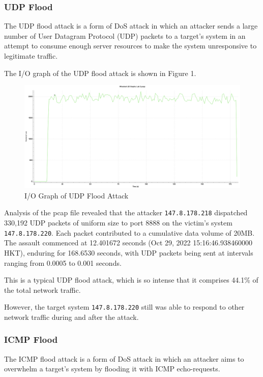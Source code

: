 \documentclass{article}
\begin{document}
    \subsubsection{UDP Flood}\label{subsubsec:udp-flood}
    The UDP flood attack is a form of DoS attack in which an attacker sends a large number of User Datagram Protocol (UDP) packets to a target's system in an attempt to consume enough server resources to make the system unresponsive to legitimate traffic.

    The I/O graph of the UDP flood attack is shown in Figure 1.

    \begin{figure}[H]
        \centering
        \includegraphics[width=\textwidth]{image/218_udp.png}
        \caption{I/O Graph of UDP Flood Attack}
        \label{fig:udp-flood-io-graph}
    \end{figure}

    Analysis of the pcap file revealed that the attacker \lstinline|147.8.178.218| dispatched 330,192 UDP packets of uniform size to port 8888 on the victim's system \lstinline|147.8.178.220|. 
    Each packet contributed to a cumulative data volume of 20MB. 
    The assault commenced at 12.401672 seconds (Oct 29, 2022 15:16:46.938460000 HKT), enduring for 168.6530 seconds, with UDP packets being sent at intervals ranging from 0.0005 to 0.001 seconds.

    This is a typical UDP flood attack, which is so intense that it comprises 44.1\% of the total network traffic.
    
    However, the target system \lstinline|147.8.178.220| still was able to respond to other network traffic during and after the attack.

    \subsubsection{ICMP Flood}\label{subsubsec:icmp-flood}
    The ICMP flood attack is a form of DoS attack in which an attacker aims to overwhelm a target's system by flooding it with ICMP echo-requests.
\end{document}

